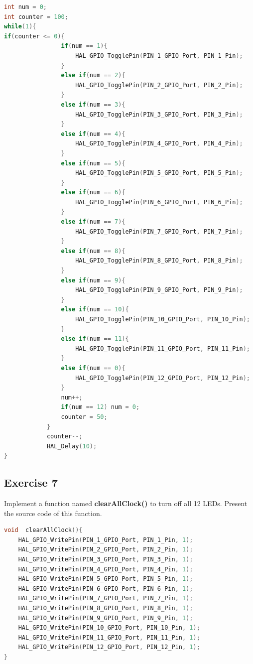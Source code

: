 \documentclass[twoside, final]{hcmut_report}
\begin{document}
\begin{lstlisting}[language=C, caption=Source code for Exercise 6]
int num = 0;
int counter = 100;
while(1){
if(counter <= 0){
			  	if(num == 1){
			  		HAL_GPIO_TogglePin(PIN_1_GPIO_Port, PIN_1_Pin);
			  	}
			  	else if(num == 2){
			  		HAL_GPIO_TogglePin(PIN_2_GPIO_Port, PIN_2_Pin);
			  	}
			  	else if(num == 3){
			  		HAL_GPIO_TogglePin(PIN_3_GPIO_Port, PIN_3_Pin);
			  	}
			  	else if(num == 4){
			  		HAL_GPIO_TogglePin(PIN_4_GPIO_Port, PIN_4_Pin);
			  	}
			  	else if(num == 5){
			  		HAL_GPIO_TogglePin(PIN_5_GPIO_Port, PIN_5_Pin);
			  	}
			  	else if(num == 6){
			  		HAL_GPIO_TogglePin(PIN_6_GPIO_Port, PIN_6_Pin);
			  	}
			  	else if(num == 7){
			  		HAL_GPIO_TogglePin(PIN_7_GPIO_Port, PIN_7_Pin);
			  	}
			  	else if(num == 8){
			  		HAL_GPIO_TogglePin(PIN_8_GPIO_Port, PIN_8_Pin);
			  	}
			  	else if(num == 9){
			  		HAL_GPIO_TogglePin(PIN_9_GPIO_Port, PIN_9_Pin);
			  	}
			  	else if(num == 10){
			  		HAL_GPIO_TogglePin(PIN_10_GPIO_Port, PIN_10_Pin);
			  	}
			  	else if(num == 11){
			  		HAL_GPIO_TogglePin(PIN_11_GPIO_Port, PIN_11_Pin);
			  	}
			  	else if(num == 0){
			  		HAL_GPIO_TogglePin(PIN_12_GPIO_Port, PIN_12_Pin);
			  	}
		  		num++;
		  		if(num == 12) num = 0;
		  		counter = 50;
		  	}
		  	counter--;
		  	HAL_Delay(10);
}
\end{lstlisting}

\subsection{Exercise 7}
Implement a function named \textbf{clearAllClock()} to turn off all 12 LEDs. Present the source code of this function.

\begin{lstlisting}[language=C, caption=Source code for the clearAllClock() function]
void  clearAllClock(){
	HAL_GPIO_WritePin(PIN_1_GPIO_Port, PIN_1_Pin, 1);
	HAL_GPIO_WritePin(PIN_2_GPIO_Port, PIN_2_Pin, 1);
	HAL_GPIO_WritePin(PIN_3_GPIO_Port, PIN_3_Pin, 1);
	HAL_GPIO_WritePin(PIN_4_GPIO_Port, PIN_4_Pin, 1);
	HAL_GPIO_WritePin(PIN_5_GPIO_Port, PIN_5_Pin, 1);
	HAL_GPIO_WritePin(PIN_6_GPIO_Port, PIN_6_Pin, 1);
	HAL_GPIO_WritePin(PIN_7_GPIO_Port, PIN_7_Pin, 1);
	HAL_GPIO_WritePin(PIN_8_GPIO_Port, PIN_8_Pin, 1);
	HAL_GPIO_WritePin(PIN_9_GPIO_Port, PIN_9_Pin, 1);
	HAL_GPIO_WritePin(PIN_10_GPIO_Port, PIN_10_Pin, 1);
	HAL_GPIO_WritePin(PIN_11_GPIO_Port, PIN_11_Pin, 1);
	HAL_GPIO_WritePin(PIN_12_GPIO_Port, PIN_12_Pin, 1);
}
\end{lstlisting}
\end{document}
